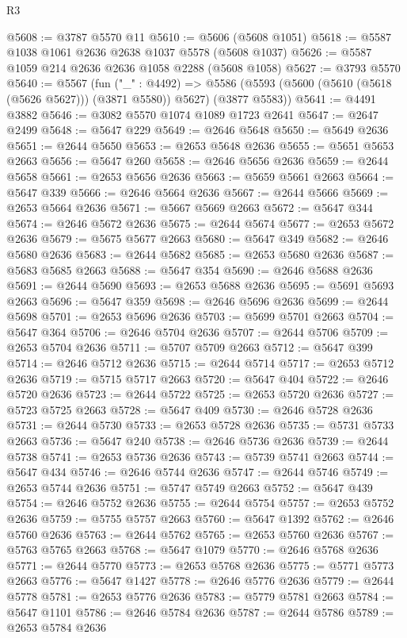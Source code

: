 \begin{lexlean}{R3}
\begin{coremodule}
@5608 := @3787 @5570 @11
@5610 := @5606 (@5608 @1051)
@5618 := @5587 @1038 @1061 @2636 @2638 @1037 @5578 (@5608 @1037)
@5626 := @5587 @1059 @214 @2636 @2636 @1058 @2288 (@5608 @1058)
@5627 := @3793 @5570
@5640 := @5567
    (fun ("_" : @4492) =>
    @5586 (@5593 (@5600 (@5610 (@5618 (@5626 @5627))) (@3871 @5580)) @5627) (@3877 @5583))
@5641 := @4491 @3882
@5646 := @3082 @5570 @1074 @1089 @1723 @2641
@5647 := @2647 @2499
@5648 := @5647 @229
@5649 := @2646 @5648
@5650 := @5649 @2636
@5651 := @2644 @5650
@5653 := @2653 @5648 @2636
@5655 := @5651 @5653 @2663
@5656 := @5647 @260
@5658 := @2646 @5656 @2636
@5659 := @2644 @5658
@5661 := @2653 @5656 @2636
@5663 := @5659 @5661 @2663
@5664 := @5647 @339
@5666 := @2646 @5664 @2636
@5667 := @2644 @5666
@5669 := @2653 @5664 @2636
@5671 := @5667 @5669 @2663
@5672 := @5647 @344
@5674 := @2646 @5672 @2636
@5675 := @2644 @5674
@5677 := @2653 @5672 @2636
@5679 := @5675 @5677 @2663
@5680 := @5647 @349
@5682 := @2646 @5680 @2636
@5683 := @2644 @5682
@5685 := @2653 @5680 @2636
@5687 := @5683 @5685 @2663
@5688 := @5647 @354
@5690 := @2646 @5688 @2636
@5691 := @2644 @5690
@5693 := @2653 @5688 @2636
@5695 := @5691 @5693 @2663
@5696 := @5647 @359
@5698 := @2646 @5696 @2636
@5699 := @2644 @5698
@5701 := @2653 @5696 @2636
@5703 := @5699 @5701 @2663
@5704 := @5647 @364
@5706 := @2646 @5704 @2636
@5707 := @2644 @5706
@5709 := @2653 @5704 @2636
@5711 := @5707 @5709 @2663
@5712 := @5647 @399
@5714 := @2646 @5712 @2636
@5715 := @2644 @5714
@5717 := @2653 @5712 @2636
@5719 := @5715 @5717 @2663
@5720 := @5647 @404
@5722 := @2646 @5720 @2636
@5723 := @2644 @5722
@5725 := @2653 @5720 @2636
@5727 := @5723 @5725 @2663
@5728 := @5647 @409
@5730 := @2646 @5728 @2636
@5731 := @2644 @5730
@5733 := @2653 @5728 @2636
@5735 := @5731 @5733 @2663
@5736 := @5647 @240
@5738 := @2646 @5736 @2636
@5739 := @2644 @5738
@5741 := @2653 @5736 @2636
@5743 := @5739 @5741 @2663
@5744 := @5647 @434
@5746 := @2646 @5744 @2636
@5747 := @2644 @5746
@5749 := @2653 @5744 @2636
@5751 := @5747 @5749 @2663
@5752 := @5647 @439
@5754 := @2646 @5752 @2636
@5755 := @2644 @5754
@5757 := @2653 @5752 @2636
@5759 := @5755 @5757 @2663
@5760 := @5647 @1392
@5762 := @2646 @5760 @2636
@5763 := @2644 @5762
@5765 := @2653 @5760 @2636
@5767 := @5763 @5765 @2663
@5768 := @5647 @1079
@5770 := @2646 @5768 @2636
@5771 := @2644 @5770
@5773 := @2653 @5768 @2636
@5775 := @5771 @5773 @2663
@5776 := @5647 @1427
@5778 := @2646 @5776 @2636
@5779 := @2644 @5778
@5781 := @2653 @5776 @2636
@5783 := @5779 @5781 @2663
@5784 := @5647 @1101
@5786 := @2646 @5784 @2636
@5787 := @2644 @5786
@5789 := @2653 @5784 @2636

\end{coremodule}
\end{lexlean}

